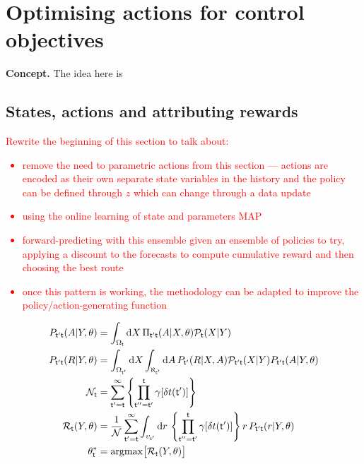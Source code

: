 \chapter{\sffamily Optimising actions for control objectives}

{\bfseries\sffamily Concept.} The idea here is 

\section{\sffamily States, actions and attributing rewards}

\textcolor{red}{Rewrite the beginning of this section to talk about:
\begin{itemize}
\item{remove the need to parametric actions from this section --- actions are encoded as their own separate state variables in the history and the policy can be defined through $z$ which can change through a data update}
\item{using the online learning of state and parameters MAP}
\item{forward-predicting with this ensemble given an ensemble of policies to try, applying a discount to the forecasts to compute cumulative reward and then choosing the best route}
\item{once this pattern is working, the methodology can be adapted to improve the policy/action-generating function}    
\end{itemize}
\begin{align}
P_{{\sf t}'{\sf t}}(A\vert Y,\theta ) &= \int_{\Omega_{{\sf t}}} {\rm d}X \, \Pi_{{\sf t}'{\sf t}}(A\vert X,\theta){\cal P}_{{\sf t}}(X\vert Y) \\
P_{{\sf t}'{\sf t}}(R\vert Y,\theta ) &= \int_{\Omega_{{\sf t}'}} {\rm d}X \int_{\aleph_{{\sf t}'}} {\rm d}A  \, P_{{\sf t}'}(R\vert X, A){\cal P}_{{\sf t}'{\sf t}}(X\vert Y)P_{{{\sf t}}'{\sf t}}(A\vert Y,\theta) \\
{\cal N}_{{\sf t}} &= \sum_{{\sf t}'={\sf t}}^{\infty}\left\{ \prod_{{\sf t}''={\sf t}'}^{{\sf t}} \gamma [\delta t({\sf t}')] \right\} \\
{\cal R}_{{\sf t}}(Y,\theta ) &= \frac{1}{{\cal N}}\sum_{{\sf t}'={\sf t}}^{\infty}\int_{\upsilon_{{\sf t}'}} {\rm d}r \,\left\{ \prod_{{\sf t}''={\sf t}'}^{{\sf t}} \gamma [\delta t({\sf t}')] \right\} r \,P_{{\sf t}'{\sf t}}(r\vert Y,\theta ) \\
\theta^*_{{\sf t}} &= {\rm argmax} \big[ {\cal R}_{{\sf t}}(Y,\theta )\big]
\end{align}
}

